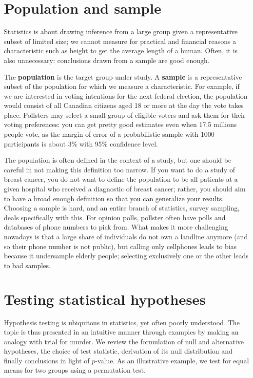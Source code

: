 \documentclass[
]{book}
\begin{document}
\hypertarget{population-and-sample}{%
\section{Population and sample}\label{population-and-sample}}

Statistics is about drawing inference from a large group given a representative subset of limited size; we cannot measure for practical and financial reasons a characteristic such as height to get the average length of a human. Often, it is also unnecessary: conclusions drawn from a sample are good enough.

The \textbf{population} is the target group under study. A \textbf{sample} is a representative subset of the population for which we measure a characteristic. For example, if we are interested in voting intentions for the next federal election, the population would consist of all Canadian citizens aged 18 or more at the day the vote takes place. Pollsters may select a small group of eligible voters and ask them for their voting preferences: you can get pretty good estimates even when 17.5 millions people vote, as the margin of error of a probabilistic sample with 1000 participants is about 3\% with 95\% confidence level.

The population is often defined in the context of a study, but one should be careful in not making this definition too narrow. If you want to do a study of breast cancer, you do not want to define the population to be all patients at a given hospital who received a diagnostic of breast cancer; rather, you should aim to have a broad enough definition so that you can generalize your results.
Choosing a sample is hard, and an entire branch of statistics, survey sampling, deals specifically with this. For opinion polls, pollster often have polls and databases of phone numbers to pick from. What makes it more challenging nowadays is that a large share of individuals do not own a landline anymore (and so their phone number is not public), but calling only cellphones leads to bias because it undersample elderly people; selecting exclusively one or the other leads to bad samples.

\hypertarget{testing-statistical-hypotheses}{%
\section{Testing statistical hypotheses}\label{testing-statistical-hypotheses}}

Hypothesis testing is ubiquitous in statistics, yet often poorly understood. The topic is thus presented in an intuitive manner through examples by making an analogy with trial for murder. We review the formulation of null and alternative hypotheses, the choice of test statistic, derivation of its null distribution and finally conclusions in light of \(p\)-value. As an illustrative example, we test for equal means for two groups using a permutation test.
\end{document}
